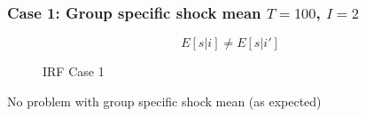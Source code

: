\documentclass[notes,11pt, aspectratio = 169]{beamer}
\begin{document}
\begin{frame}
    \frametitle{Case 1: Group specific shock mean  $T=100$, $I=2$}
    \[E[s|i] \neq E[s|i'] \] 
    
    
\begin{figure}
    \centering
  \caption{IRF Case 1}
  \end{figure}
  
  No problem with group specific shock mean (as expected)
  
\end{frame}
\end{document}
